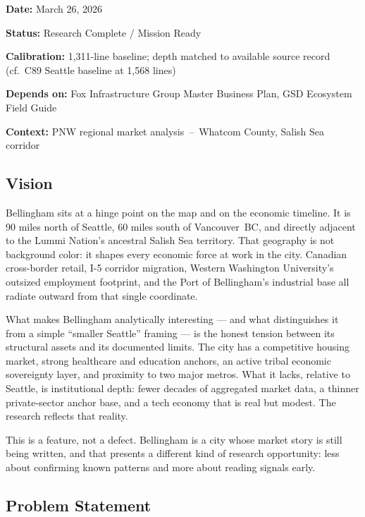 \documentclass[11pt,letterpaper]{article}
\newcommand{\metafield}[2]{\textbf{\sffamily #1} #2\par}
\begin{document}
\metafield{Date:}{March 26, 2026}
\metafield{Status:}{Research Complete / Mission Ready}
\metafield{Calibration:}{1,311-line baseline; depth matched to available source record (cf.\ C89 Seattle baseline at 1,568 lines)}
\metafield{Depends on:}{Fox Infrastructure Group Master Business Plan, GSD Ecosystem Field Guide}
\metafield{Context:}{PNW regional market analysis~--~Whatcom County, Salish Sea corridor}

\subsection{Vision}

Bellingham sits at a hinge point on the map and on the economic timeline. It is 90 miles north of Seattle, 60 miles south of Vancouver~BC, and directly adjacent to the Lummi Nation's ancestral Salish Sea territory. That geography is not background color: it shapes every economic force at work in the city. Canadian cross-border retail, I-5 corridor migration, Western Washington University's outsized employment footprint, and the Port of Bellingham's industrial base all radiate outward from that single coordinate.

What makes Bellingham analytically interesting --- and what distinguishes it from a simple ``smaller Seattle'' framing --- is the honest tension between its structural assets and its documented limits. The city has a competitive housing market, strong healthcare and education anchors, an active tribal economic sovereignty layer, and proximity to two major metros. What it lacks, relative to Seattle, is institutional depth: fewer decades of aggregated market data, a thinner private-sector anchor base, and a tech economy that is real but modest. The research reflects that reality.

This is a feature, not a defect. Bellingham is a city whose market story is still being written, and that presents a different kind of research opportunity: less about confirming known patterns and more about reading signals early.

\subsection{Problem Statement}
\end{document}
